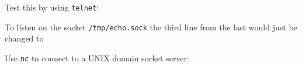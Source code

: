 \begin{Shaded}
\begin{Highlighting}[]
 \NormalTok{(}\NormalTok{);}
 \NormalTok{(}
  \NormalTok{(}\NormalTok{);}
  \NormalTok{(}\NormalTok{, }\NormalTok{() \{}
    \NormalTok{(}\NormalTok{);}
  \NormalTok{\});}
  \NormalTok{(}\NormalTok{);}
\NormalTok{\});}
\NormalTok{(}\NormalTok{, }\NormalTok{() \{ }
  \NormalTok{(}\NormalTok{);}
\NormalTok{\});}
\end{Highlighting}
\end{Shaded}

Test this by using \texttt{telnet}:

\begin{Shaded}
\begin{Highlighting}[]
\end{Highlighting}
\end{Shaded}

To listen on the socket \texttt{/tmp/echo.sock} the third line from the
last would just be changed to

\begin{Shaded}
\begin{Highlighting}[]
\NormalTok{(}\NormalTok{, }\NormalTok{() \{ }
\end{Highlighting}
\end{Shaded}

Use \texttt{nc} to connect to a UNIX domain socket server:

\begin{Shaded}
\begin{Highlighting}[]
\end{Highlighting}
\end{Shaded}

